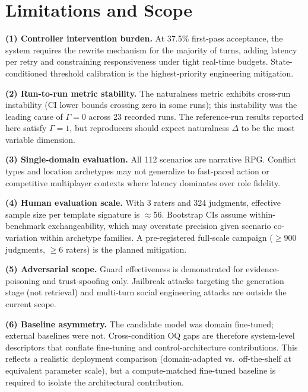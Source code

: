 \documentclass[conference]{IEEEtran}
\begin{document}
\section{Limitations and Scope}

\textbf{(1) Controller intervention burden.}
At 37.5\% first-pass acceptance, the system requires the
rewrite mechanism for the majority of turns, adding latency
per retry and constraining responsiveness under tight real-time
budgets. State-conditioned threshold calibration is the
highest-priority engineering mitigation.

\textbf{(2) Run-to-run metric stability.}
The naturalness metric exhibits cross-run instability (CI lower
bounds crossing zero in some runs); this instability was the
leading cause of $\Gamma=0$ across 23 recorded runs. The
reference-run results reported here satisfy $\Gamma{=}1$, but
reproducers should expect naturalness $\Delta$ to be the most
variable dimension.

\textbf{(3) Single-domain evaluation.}
All 112 scenarios are narrative RPG. Conflict types and
location archetypes may not generalize to fast-paced action
or competitive multiplayer contexts where latency dominates
over role fidelity.

\textbf{(4) Human evaluation scale.}
With 3 raters and 324 judgments, effective sample size per
template signature is $\approx\!56$. Bootstrap CIs assume
within-benchmark exchangeability, which may overstate
precision given scenario co-variation within archetype
families. A pre-registered full-scale campaign
($\ge\!900$ judgments, $\ge\!6$ raters) is the planned
mitigation.

\textbf{(5) Adversarial scope.}
Guard effectiveness is demonstrated for evidence-poisoning
and trust-spoofing only. Jailbreak attacks targeting the
generation stage (not retrieval) and multi-turn social
engineering attacks are outside the current scope.

\textbf{(6) Baseline asymmetry.}
The candidate model was domain fine-tuned; external baselines
were not. Cross-condition OQ gaps are therefore system-level
descriptors that conflate fine-tuning and control-architecture
contributions. This reflects a realistic deployment comparison
(domain-adapted vs.\ off-the-shelf at equivalent parameter
scale), but a compute-matched fine-tuned baseline is required
to isolate the architectural contribution.

\end{document}
